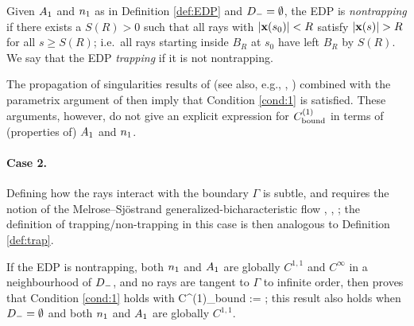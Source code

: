 \begin{definition}\label{def:trap}
Given $A_{1}$ and $n_{1}$ as in Definition \ref{def:EDP} and $D_{-}=\emptyset$, the EDP is \emph{nontrapping} if 
there exists a $S(R)>0$ such that all rays with $|\mathbf{x}(s_0)|<R$ satisfy $|\bx(s)|>R$ for all $s\geq S(R)$; i.e.~all rays starting inside $B_R$ at $s_0$ have left $B_R$ by $S(R)$. 
We say that the EDP \emph{trapping} if it is not nontrapping.
\end{definition}

The propagation of singularities results of \cite[\S VI]{DuHo:72} (see also, e.g., \cite[Chapter 24]{Ho:85}, \cite[\S12.3]{Zw:12}) combined with the parametrix argument of \cite{Va:75} then imply that Condition \ref{cond:1} is satisfied. These arguments, however, do not give an explicit expression for $C^{(1)}_{\rm bound}$ in terms of (properties of) $A_{1}$ and $n_{1}$.

\paragraph{Case 2.}
Defining how the rays interact with the boundary $\Gamma$ is subtle, and requires the notion of the Melrose--Sj{\"o}strand generalized-bicharacteristic flow 
\cite[\S24.3]{Ho:85}, \cite{MeSj:78}, \cite{MeSj:82}; the definition of trapping/non-trapping in this case \cite[Definition 7.20]{MeSj:82} is then analogous to Definition \ref{def:trap}.

If the EDP is nontrapping, both $n_{1}$ and $A_{1}$ are globally $C^{1,1}$ and $C^\infty$ in a neighbourhood of $D_{-}$, and no rays are tangent to $\Gamma$ to infinite order, 
then \cite[Theorem 2 and Equation 6.32]{GaSpWu:18} proves that Condition \ref{cond:1} holds with
\beqs
C^{(1)}_{\rm bound} :=   ;
\eeqs
this result also holds when $D_{-}=\emptyset$ and both $n_{1}$ and $A_{1}$ are globally $C^{1,1}$.

